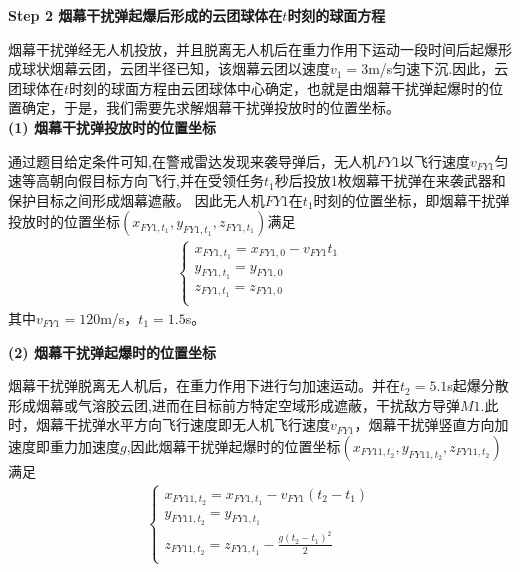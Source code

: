 \documentclass[../main.tex]{subfiles}
\begin{document}
\noindent\textbf{Step 2 烟幕干扰弹起爆后形成的云团球体在$t$时刻的球面方程}
\par 烟幕干扰弹经无人机投放，并且脱离无人机后在重力作用下运动一段时间后起爆形成球状烟幕云团，云团半径已知，该烟幕云团以速度$v_1=3$m/s匀速下沉.因此，云团球体在$t$时刻的球面方程由云团球体中心确定，也就是由烟幕干扰弹起爆时的位置确定，于是，我们需要先求解烟幕干扰弹投放时的位置坐标。
\\
\noindent \textbf{(1) 烟幕干扰弹投放时的位置坐标}
\par 通过题目给定条件可知,在警戒雷达发现来袭导弹后，无人机\( FY1 \)以飞行速度\( v_{FY1} \)匀速等高朝向假目标方向飞行,并在受领任务$t_1$秒后投放1枚烟幕干扰弹在来袭武器和保护目标之间形成烟幕遮蔽。
因此无人机$FY1$在$t_1$时刻的位置坐标，即烟幕干扰弹投放时的位置坐标$(x_{FY1,t_1}, y_{FY1,{t_1}}, z_{FY1,{t_1}})$满足
\begin{align}\label{1.8}
\left\{ \begin{array}{l}
x_{FY1,{t_1}}=x_{FY1,0}-v_{FY1}{t_1}\\
y_{FY1,{t_1}}=y_{FY1,0}\\
z_{FY1,{t_1}}=z_{FY1,0}\\
\end{array} \right. 
\end{align}
其中\( v_{FY1} = 120\)m/s，$t_1=1.5$s。


\noindent\textbf{(2) 烟幕干扰弹起爆时的位置坐标}
\par 烟幕干扰弹脱离无人机后，在重力作用下进行匀加速运动。并在$t_2=5.1$s起爆分散形成烟幕或气溶胶云团,进而在目标前方特定空域形成遮蔽，干扰敌方导弹$M1$.此时，烟幕干扰弹水平方向飞行速度即无人机飞行速度\( v_{FY1} \)，烟幕干扰弹竖直方向加速度即重力加速度$g$,因此烟幕干扰弹起爆时的位置坐标$\left( x_{FY11,t_2},y_{FY11,t_2},z_{FY11,t_2} \right)$满足
\begin{align}\label{1.9}
\left\{ \begin{array}{l}
	x_{FY11,{t_2}}=x_{FY1,t_1}-v_{FY1}(t_2-t_1)\\
	y_{FY11,{t_2}}=y_{FY1,t_1}\\
	z_{FY11,{t_2}}=z_{FY1,t_1}-\frac{g(t_2-t_1)^2}{2}\\
\end{array} \right. 
\end{align}
\end{document}
